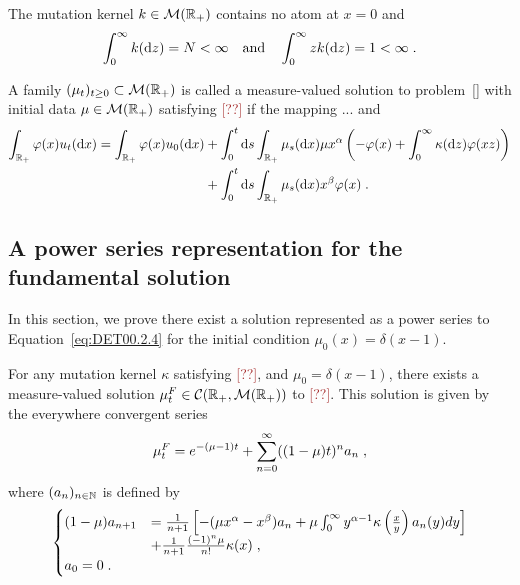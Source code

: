 \documentclass[11pt]{amsart}
\newcommand{\R}{\RR}
\newcommand{\f}{\frac}
\newcommand{\dd}{\mathrm{d}}
\newcommand{\ndr}[1]{\textcolor{brown}{[#1]}}
\begin{document}
\begin{hypothesis}
The mutation kernel $k \in \mathcal{M}(\mathbb{R}_+)$ contains no atom at $x = 0$ and 
$$ \int_0^\infty k(\dd z) = N < \infty \mtext{and} \int_0^\infty z k(\dd z) = 1 < \infty \eqfinp$$ 
\end{hypothesis}

\begin{definition}\label{def:DETinv2.1}
    A family $(\mu_t)_{t \geq 0} \subset \mathcal{M}(\mathbb{R}_+)$ is called a measure-valued solution to problem~\eqref{} with initial data $\mu \in \mathcal{M}(\mathbb{R}_+)$ satisfying \ndr{??} if the mapping ... 
    and 
    \begin{align*}
        \int_{\RR_+} \varphi(x) u_t(\dd x)
        = 
        \int_{\RR_+} \varphi(x) u_0(\dd x) 
        &+ \int_0^t\dd s \int_{\RR_+} \mu_s(\dd x)\mu x^\alpha \left( - \varphi(x) + \int_0^\infty \kappa(\dd z)\varphi(xz)\right) \\
        &+ \int_0^t\dd s \int_{\RR_+} \mu_s(\dd x) x^\beta \varphi(x)
        \eqfinp
    \end{align*}
\end{definition}

\subsection{A power series representation for the fundamental solution}
In this section, we prove there exist a solution represented as a power series to Equation~\eqref{eq:DET00.2.4} for the initial condition $\mu_0(x) = \delta(x-1)$.\\

\begin{theorem}
    For any mutation kernel $\kappa$ satisfying \ndr{??}, and $\mu_0 = \delta(x-1)$, there exists a measure-valued solution $\mu_t^F \in \Ccal(\RR_+, \Mcal(\R_+))$ to \ndr{??}. This solution is given by the everywhere convergent series
    \begin{align}
        \mu_t^F 
        = 
        e^{-(\mu-1)t} + \sum_{n = 0}^\infty ((1-\mu) t)^n a_n
        \; ,
    \end{align}
where $(a_n)_{n \in \mathbb{N}}$ is defined by 
\begin{align*}
    \begin{cases}
    (1-\mu) a_{n+1} 
    &= \frac{1}{n+1}\left[ -(\mu x^{\alpha} - x^\beta) a_n + \mu \int_0^\infty y^{\alpha-1} \kappa \left( \f{x}{y}\right) a_n(y) dy \right] \\
    &+ \frac{1}{n+1} \frac{(-1)^n \mu }{n!}\kappa(x) 
    \eqfinv \\
    a_0 = 0 \eqfinp
    \end{cases}
\end{align*}
\end{theorem}
\end{document}
